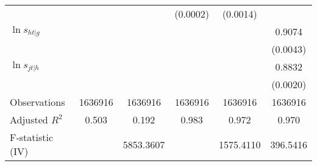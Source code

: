 \begin{table}[htbp]
\begin{tabular}{l*{5}{c}}
                    &                     &                     &    (0.0002)         &    (0.0014)         &                     \\
\addlinespace
$\ln s_{ht|g}$      &                     &                     &                     &                     &      0.9074\sym{***}\\
                    &                     &                     &                     &                     &    (0.0043)         \\
\addlinespace
$\ln s_{jt|h}$      &                     &                     &                     &                     &      0.8832\sym{***}\\
                    &                     &                     &                     &                     &    (0.0020)         \\
\midrule
Observations        &     1636916         &     1636916         &     1636916         &     1636916         &     1636916         \\
Adjusted \(R^{2}\)  &       0.503         &       0.192         &       0.983         &       0.972         &       0.970         \\
F-statistic (IV)    &                     &   5853.3607         &                     &   1575.4110         &    396.5416         \\
\bottomrule
\end{tabular}
\end{table}
